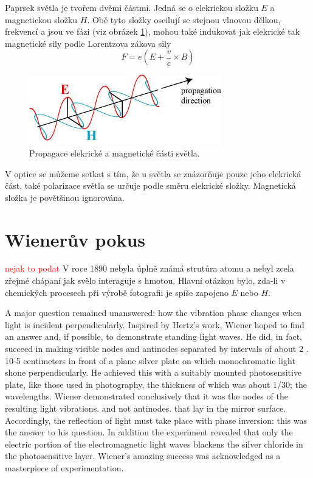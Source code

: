 \documentclass[12pt,a4paper,titlepage,final]{report}
\newcommand\todo[1]{\textcolor{red}{#1}}
\begin{document}
Paprsek světla je tvořem dvěmi částmi. Jedná se o elekrickou složku
$E$ a magnetickou složku $H$. Obě tyto složky oscilují se stejnou
vlnovou dělkou, frekvencí a jsou ve fázi (viz obrázek \ref{fig:ehpropagation}), mohou také indukovat jak elekrické tak magnetické sily podle Lorentzova zákova sily
\begin{equation}
F = e(E+\frac{v}{c}\times B)
\end{equation}

\begin{figure}[!htb]
   \centering
 	\includegraphics{ehpropagation}
   \caption{Propagace elekrické a magnetické části světla.}
   \label{fig:ehpropagation}
\end{figure}

V optice se můžeme setkat s tím, že u světla se znázorňuje pouze jeho
elekrická část, také polarizace světla se určuje podle směru elekrické složky. Magnetická složka je povětšinou ignorována.

\section{Wienerův pokus}
\todo{nejak to podat}
V roce 1890 nebyla úplně známá strutůra atomu a nebyl zcela zřejmé
chápaní jak svělo interaguje s hmotou. Hlavní otázkou bylo, zda-li
v chemických procesech při výrobě fotografii je spíše zapojeno 
$E$ nebo $H$.

A major question remained unanswered: how the vibration phase changes when light is incident perpendicularly. Inspired by Hertz’s work, Wiener hoped to find an answer and, if possible, to demonstrate standing light waves. He did, in fact, succeed in making visible nodes and antinodes separated by intervals of about 2 . 10-5 centimeters in front of a plane silver plate on which monochromatic light shone perpendicularly. He achieved this with a suitably mounted photosensitive plate, like those used in photography, the thickness of which was about 1/30; the wavelengths. Wiener demonstrated conclusively that it was the nodes of the resulting light vibrations. and not antinodes. that lay in the mirror surface. Accordingly, the reflection of light must take place with phase inversion: this was the answer to his question. In addition the experiment revealed that only the electric portion of the electromagnetic light waves blackens the silver chloride in the photosensitive layer. Wiener’s amazing success was acknowledged as a masterpiece of experimentation.
\end{document}
